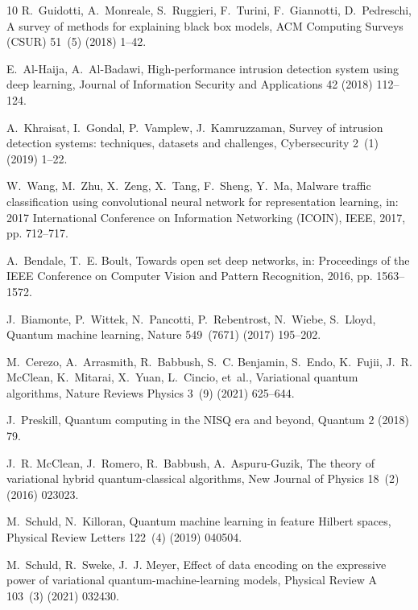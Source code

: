 \documentclass[preprint,12pt]{elsarticle}
\begin{document}
\begin{thebibliography}{10}
R.~Guidotti, A.~Monreale, S.~Ruggieri, F.~Turini, F.~Giannotti, D.~Pedreschi,
\newblock A survey of methods for explaining black box models,
\newblock ACM Computing Surveys (CSUR) 51~(5) (2018) 1--42.

E.~Al-Haija, A.~Al-Badawi,
\newblock High-performance intrusion detection system using deep learning,
\newblock Journal of Information Security and Applications 42 (2018) 112--124.

A.~Khraisat, I.~Gondal, P.~Vamplew, J.~Kamruzzaman,
\newblock Survey of intrusion detection systems: techniques, datasets and challenges,
\newblock Cybersecurity 2~(1) (2019) 1--22.

W.~Wang, M.~Zhu, X.~Zeng, X.~Tang, F.~Sheng, Y.~Ma,
\newblock Malware traffic classification using convolutional neural network for representation learning,
\newblock in: 2017 International Conference on Information Networking (ICOIN), IEEE, 2017, pp. 712--717.

A.~Bendale, T.~E. Boult,
\newblock Towards open set deep networks,
\newblock in: Proceedings of the IEEE Conference on Computer Vision and Pattern Recognition, 2016, pp. 1563--1572.

J.~Biamonte, P.~Wittek, N.~Pancotti, P.~Rebentrost, N.~Wiebe, S.~Lloyd,
\newblock Quantum machine learning,
\newblock Nature 549~(7671) (2017) 195--202.

M.~Cerezo, A.~Arrasmith, R.~Babbush, S.~C. Benjamin, S.~Endo, K.~Fujii, J.~R. McClean, K.~Mitarai, X.~Yuan, L.~Cincio, et~al.,
\newblock Variational quantum algorithms,
\newblock Nature Reviews Physics 3~(9) (2021) 625--644.

J.~Preskill,
\newblock Quantum computing in the NISQ era and beyond,
\newblock Quantum 2 (2018) 79.

J.~R. McClean, J.~Romero, R.~Babbush, A.~Aspuru-Guzik,
\newblock The theory of variational hybrid quantum-classical algorithms,
\newblock New Journal of Physics 18~(2) (2016) 023023.

M.~Schuld, N.~Killoran,
\newblock Quantum machine learning in feature Hilbert spaces,
\newblock Physical Review Letters 122~(4) (2019) 040504.

M.~Schuld, R.~Sweke, J.~J. Meyer,
\newblock Effect of data encoding on the expressive power of variational quantum-machine-learning models,
\newblock Physical Review A 103~(3) (2021) 032430.


\end{thebibliography}
\end{document}

